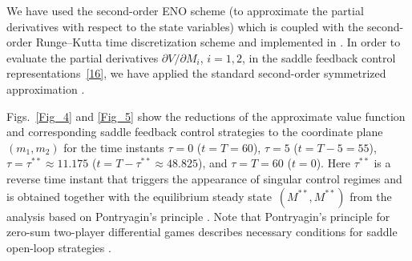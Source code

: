 \documentclass[a4paper,12pt]{article}
\begin{document}
We have used the second-order ENO scheme (to approximate the partial derivatives with respect to the state variables) which is
coupled with the second-order Runge--Kutta time discretization scheme and implemented in \cite{ROCHJ2019}. In order to evaluate
the partial derivatives $ \partial V / \partial M_i $, $ i = 1,2 $, in the saddle feedback control representations~\cref{16},
we have applied the standard second-order symmetrized approximation \cite[\S 5.7]{PressTeukolskyVetterlingFlannery2007}.

Figs.~\ref{Fig_4} and \ref{Fig_5} show the reductions of the approximate value function and corresponding saddle feedback control
strategies to the coordinate plane $ (m_1, m_2) $ for the time instants $ \tau = 0 $ ($ t = T = 60 $), $ \tau = 5 $ ($ t = T - 5 = 55 $),
$ \tau = \tau^{**} \approx 11.175 $ ($ t = T - \tau^{**} \approx 48.825 $), and $ \tau = T = 60 $ ($ t = 0 $). Here $ \tau^{**} $ is
a reverse time instant that triggers the appearance of singular control regimes and is obtained together with the equilibrium
steady state~$ \left( M^{**}, M^{**} \right) $ from the analysis based on Pontryagin's principle
\cite{YegorovGrognardMailleretHalkettBernhard2019}. Note that Pontryagin's principle for zero-sum two-player differential games describes
necessary conditions for saddle open-loop strategies \cite{Yong2015}.
\end{document}
